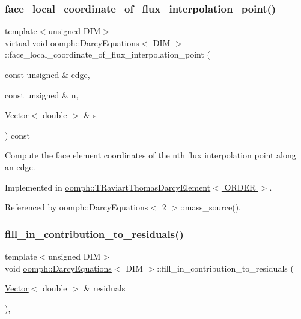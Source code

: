 \subsubsection{\texorpdfstring{face\+\_\+local\+\_\+coordinate\+\_\+of\+\_\+flux\+\_\+interpolation\+\_\+point()}{face\_local\_coordinate\_of\_flux\_interpolation\_point()}}
{\footnotesize\ttfamily template$<$unsigned D\+IM$>$ \\
virtual void \hyperlink{classoomph_1_1DarcyEquations}{oomph\+::\+Darcy\+Equations}$<$ D\+IM $>$\+::face\+\_\+local\+\_\+coordinate\+\_\+of\+\_\+flux\+\_\+interpolation\+\_\+point (\begin{DoxyParamCaption}\item[{const unsigned \&}]{edge,  }\item[{const unsigned \&}]{n,  }\item[{\hyperlink{classoomph_1_1Vector}{Vector}$<$ double $>$ \&}]{s }\end{DoxyParamCaption}) const\hspace{0.3cm}{\ttfamily [pure virtual]}}



Compute the face element coordinates of the nth flux interpolation point along an edge. 



Implemented in \hyperlink{classoomph_1_1TRaviartThomasDarcyElement_a21436d43ed647f9c0aeb56fe776d63cd}{oomph\+::\+T\+Raviart\+Thomas\+Darcy\+Element$<$ O\+R\+D\+E\+R $>$}.



Referenced by oomph\+::\+Darcy\+Equations$<$ 2 $>$\+::mass\+\_\+source().

\mbox{\label{classoomph_1_1DarcyEquations_a80171b8774d687ec6337f5be1a7f5fdd}} 
\subsubsection{\texorpdfstring{fill\+\_\+in\+\_\+contribution\+\_\+to\+\_\+residuals()}{fill\_in\_contribution\_to\_residuals()}}
{\footnotesize\ttfamily template$<$unsigned D\+IM$>$ \\
void \hyperlink{classoomph_1_1DarcyEquations}{oomph\+::\+Darcy\+Equations}$<$ D\+IM $>$\+::fill\+\_\+in\+\_\+contribution\+\_\+to\+\_\+residuals (\begin{DoxyParamCaption}\item[{\hyperlink{classoomph_1_1Vector}{Vector}$<$ double $>$ \&}]{residuals }\end{DoxyParamCaption})\hspace{0.3cm}{\ttfamily [inline]}, {\ttfamily [virtual]}}



